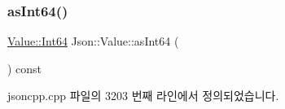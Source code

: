 \mbox{\label{class_json_1_1_value_aa647ac4fe51a2e325c063ebe32262b44}} 
\subsubsection{\texorpdfstring{as\+Int64()}{asInt64()}}
{\footnotesize\ttfamily \hyperlink{class_json_1_1_value_a1b86af9f85f0f1baa972c3319fa22695}{Value\+::\+Int64} Json\+::\+Value\+::as\+Int64 (\begin{DoxyParamCaption}{ }\end{DoxyParamCaption}) const}



jsoncpp.\+cpp 파일의 3203 번째 라인에서 정의되었습니다.


